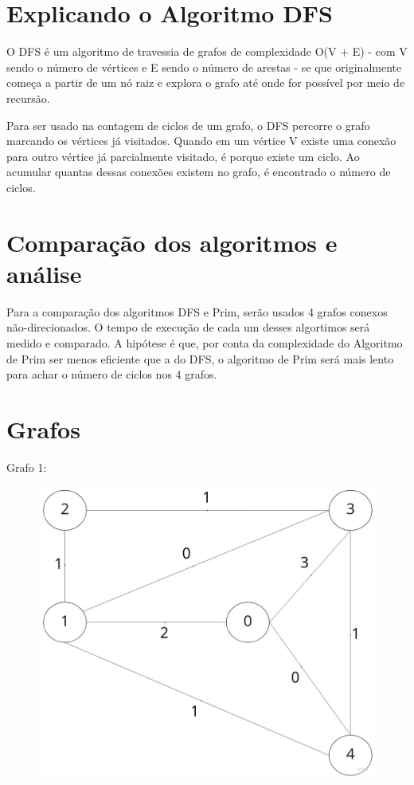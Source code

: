 \documentclass[12pt]{article}
\begin{document}
\section*{Explicando o Algoritmo DFS}
O DFS é um algoritmo de travessia de grafos de complexidade O(V + E) - com V sendo o número de 
vértices e E sendo o número de arestas - se que originalmente começa a partir de um nó raiz e 
explora o grafo até onde for possível por meio de recursão.

Para ser usado na contagem de ciclos de um grafo, o DFS percorre o grafo marcando os vértices 
já visitados. Quando em um vértice V existe uma conexão para outro vértice já parcialmente
visitado, é porque existe um ciclo. Ao acumular quantas dessas conexões existem no grafo,
é encontrado o número de ciclos.\vspace{10pt}

\section{Comparação dos algoritmos e análise}
Para a comparação dos algoritmos DFS e Prim, serão usados 4 grafos conexos não-direcionados.
O tempo de execução de cada um desses algortimos será medido e comparado. A hipótese é que,
por conta da complexidade do Algoritmo de Prim ser menos eficiente que a do DFS, o algoritmo
de Prim será mais lento para achar o número de ciclos nos 4 grafos.\vspace{20pt}


\section*{Grafos}


Grafo 1:


\begin{figure}[ht]
    \centering
    \includegraphics[scale=0.2]{grafo1.jpg}
  \end{figure}
\end{document}
